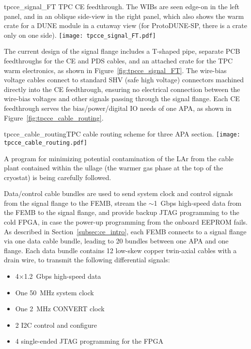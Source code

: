 \begin{cdrfigure}{tpcce_signal_FT}{
TPC CE feedthrough. The WIBs are seen edge-on in the left panel,
and in an oblique side-view in the right panel, which also shows the warm crate for a DUNE module in a cutaway view (for 
ProtoDUNE-SP, there is a crate only on one side).}
\texttt{[image: tpcce\_signal\_FT.pdf]}
\end{cdrfigure}

The current design of the signal flange includes a T-shaped pipe, separate PCB feedthroughs for the CE and PDS cables, and
an attached crate for the TPC warm electronics, as shown in Figure~\ref{fig:tpcce_signal_FT}.
The wire-bias voltage cables connect to standard SHV (safe high voltage) connectors machined directly into the CE feedthrough,
ensuring no electrical connection between the wire-bias voltages and other signals passing through the signal flange.
Each CE feedthrough serves the bias/power/digital IO needs of one APA, as shown 
in Figure~\ref{fig:tpcce_cable_routing}.  

\begin{cdrfigure}{tpcce_cable_routing}{TPC cable routing scheme for three APA section.}
\texttt{[image: tpcce\_cable\_routing.pdf]}
\end{cdrfigure}

A program for minimizing potential contamination of the LAr from the cable plant contained within the ullage
(the warmer gas phase at the top of the cryostat) 
is being carefully followed.


Data/control cable bundles are used to send system clock and control signals from the 
signal flange to the FEMB, stream the $\sim$1~Gbps high-speed data from the FEMB to the signal flange, and 
provide backup JTAG programming to the cold FPGA, in case the power-up programming from the onboard 
EEPROM fails. As described in Section~\ref{subsec:ce_intro}, each FEMB 
connects to a signal flange via one data cable bundle, leading to 20 bundles between one APA and one flange.
Each data bundle contains 12 low-skew copper twin-axial cables with a drain wire, 
to transmit the following differential signals:

\begin{itemize}
    \item 4$\times$1.2~Gbps high-speed data
    \item One 50~MHz system clock
    \item One 2~MHz CONVERT clock
    \item 2 I2C control and configure
    \item 4 single-ended JTAG programming for the FPGA
\end{itemize}

